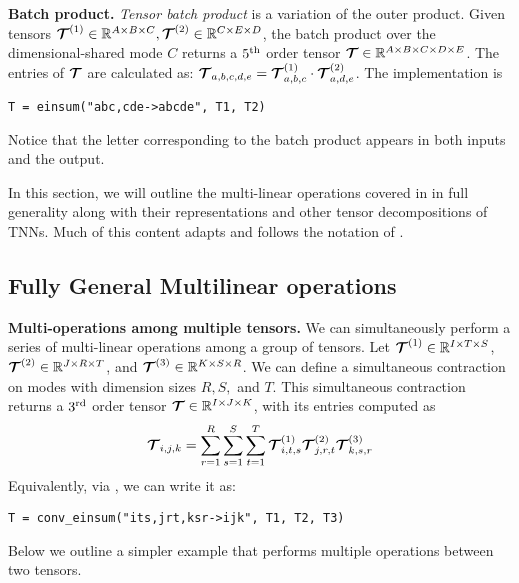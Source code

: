 \textbf{Batch product.}
{\em Tensor batch product} is a variation of the outer product. Given tensors $\bm{\mathcal{T}}^{(1)} \in \mathbb{R}^{A \times B \times C}, \bm{\mathcal{T}}^{(2)} \in \mathbb{R}^{C \times E \times D}$, the batch product over the dimensional-shared mode $C$ returns a $5^{\mathrm{th}}$ order tensor $\bm{\mathcal{T}}\in\mathbb{R}^{A \times B \times C \times D \times E}$. The entries of $\bm{\mathcal{T}}$ are calculated as:
$\bm{\mathcal{T}}_{a,b,c,d,e} =
\bm{\mathcal{T}}^{(1)}_{a,b,c} \cdot
\bm{\mathcal{T}}^{(2)}_{a,d,e}$.
The \einsum implementation is
\begin{lstlisting}
T = einsum("abc,cde->abcde", T1, T2)
\end{lstlisting}
\vspace{-1em}
Notice that the letter corresponding to the batch product appears in both inputs and the output.



In this section, we will outline the multi-linear operations covered in  in full generality along with their \conveinsum representations and other tensor decompositions of TNNs. Much of this content adapts and follows the notation of \citet{su2018tensorial}.

\subsection{Fully General Multilinear operations} 
\label{app-sub:multiops}


\textbf{Multi-operations among multiple tensors.}
We can simultaneously perform a series of multi-linear operations among a group of tensors.
Let $\bm{\mathcal{T}}^{(1)} \in \mathbb{R}^{I \times T \times S}$,
$\bm{\mathcal{T}}^{(2)} \in \mathbb{R}^{J \times R \times T}$, and
$\bm{\mathcal{T}}^{(3)} \in \mathbb{R}^{K \times S \times R}$. We can define a simultaneous contraction on modes with dimension sizes $R, S,$ and $T$.
This simultaneous contraction returns a $3^{\mathrm{rd}}$ order tensor $\bm{\mathcal{T}} \in \mathbb{R}^{I \times J \times K}$, with its entries computed as
\begin{equation}
\label{eq:multi-operation-2}
\bm{\mathcal{T}}_{i,j,k} = \sum_{r = 1}^{R} \sum_{s = 1}^{S} \sum_{t = 1}^{T} 
\bm{\mathcal{T}}^{(1)}_{i,t,s} \bm{\mathcal{T}}^{(2)}_{j,r,t} \bm{\mathcal{T}}^{(3)}_{k,s,r}
\end{equation}
Equivalently, via \conveinsum, we can write it as:
\begin{lstlisting}
T = conv_einsum("its,jrt,ksr->ijk", T1, T2, T3)
\end{lstlisting}
\vspace{-1em}
Below we outline a simpler example that performs multiple operations between two tensors.


